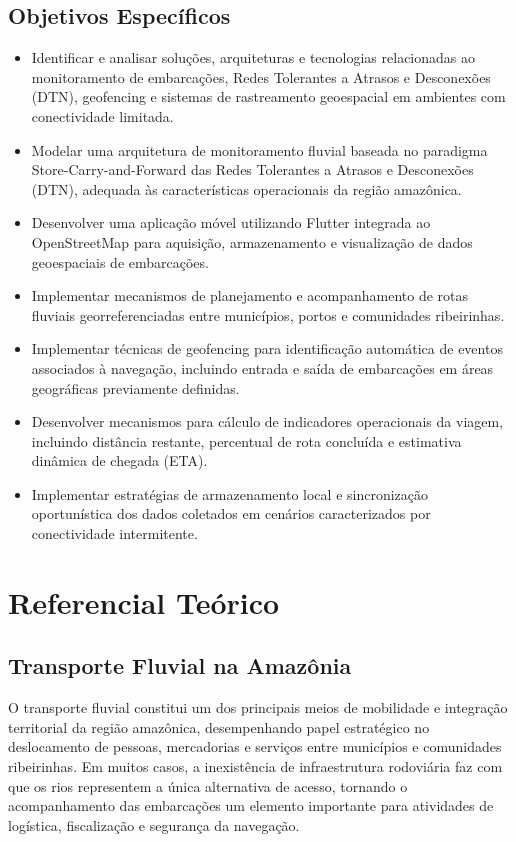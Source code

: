 \documentclass[12pt]{article}
\begin{document}
\subsection{Objetivos Específicos}

\begin{itemize}
\item Identificar e analisar soluções, arquiteturas e tecnologias relacionadas ao monitoramento de embarcações, Redes Tolerantes a Atrasos e Desconexões (DTN), geofencing e sistemas de rastreamento geoespacial em ambientes com conectividade limitada.

\item Modelar uma arquitetura de monitoramento fluvial baseada no paradigma Store-Carry-and-Forward das Redes Tolerantes a Atrasos e Desconexões (DTN), adequada às características operacionais da região amazônica.

\item Desenvolver uma aplicação móvel utilizando Flutter integrada ao OpenStreetMap para aquisição, armazenamento e visualização de dados geoespaciais de embarcações.

\item Implementar mecanismos de planejamento e acompanhamento de rotas fluviais georreferenciadas entre municípios, portos e comunidades ribeirinhas.

\item Implementar técnicas de geofencing para identificação automática de eventos associados à navegação, incluindo entrada e saída de embarcações em áreas geográficas previamente definidas.

\item Desenvolver mecanismos para cálculo de indicadores operacionais da viagem, incluindo distância restante, percentual de rota concluída e estimativa dinâmica de chegada (ETA).

\item Implementar estratégias de armazenamento local e sincronização oportunística dos dados coletados em cenários caracterizados por conectividade intermitente.
\end{itemize}

\section{Referencial Teórico}
\subsection{Transporte Fluvial na Amazônia}
O transporte fluvial constitui um dos principais meios de mobilidade e integração territorial da região amazônica, desempenhando papel estratégico no deslocamento de pessoas, mercadorias e serviços entre municípios e comunidades ribeirinhas. Em muitos casos, a inexistência de infraestrutura rodoviária faz com que os rios representem a única alternativa de acesso, tornando o acompanhamento das embarcações um elemento importante para atividades de logística, fiscalização e segurança da navegação.
\end{document}
